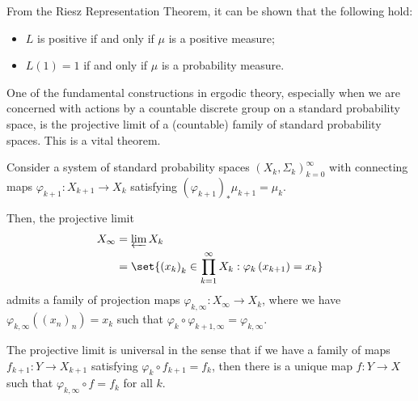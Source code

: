 \documentclass[10pt]{mypackage}
\begin{document}
\begin{remark}
  From the Riesz Representation Theorem, it can be shown that the following hold:
  \begin{itemize}
    \item $L$ is positive if and only if $\mu$ is a positive measure;
    \item $L(1) = 1$ if and only if $\mu$ is a probability measure.
  \end{itemize}
\end{remark}
One of the fundamental constructions in ergodic theory, especially when we are concerned with actions by a countable discrete group on a standard probability space, is the projective limit of a (countable) family of standard probability spaces. This is a vital theorem.

Consider a system of standard probability spaces $\left( X_k,\Sigma_k \right)_{k=0}^{\infty}$ with connecting maps $\varphi_{k+1}\colon X_{k+1}\rightarrow X_k$ satisfying $\left( \varphi_{k+1} \right)_{\ast}\mu_{k+1} = \mu_k$.

Then, the projective limit
\begin{align*}
  X_{\infty} &= \varprojlim X_k\\
             &= \set{\left( x_k \right)_{k}\in \prod_{k=1}^{\infty}X_k : \varphi_k\left( x_{k+1} \right) = x_k}
\end{align*}
admits a family of projection maps $\varphi_{k,\infty}\colon X_{\infty}\rightarrow X_k$, where we have $\varphi_{k,\infty}\left( \left( x_n \right)_n \right) = x_k$ such that $\varphi_{k}\circ \varphi_{k+1,\infty} = \varphi_{k,\infty}$.
\begin{center}
\end{center}
The projective limit is universal in the sense that if we have a family of maps $f_{k+1}\colon Y\rightarrow X_{k+1}$ satisfying $\varphi_k\circ f_{k+1} = f_k$, then there is a unique map $f\colon Y\rightarrow X$ such that $\varphi_{k,\infty}\circ f = f_k$ for all $k$.
\end{document}
